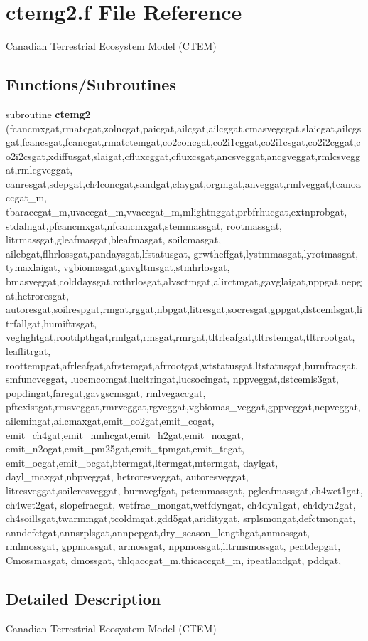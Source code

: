 \hypertarget{ctemg2_8f}{}\section{ctemg2.\+f File Reference}
\label{ctemg2_8f}


Canadian Terrestrial Ecosystem Model (C\+T\+E\+M)  


\subsection*{Functions/\+Subroutines}
\begin{DoxyCompactItemize}
\item 
\hypertarget{ctemg2_8f_a14acc07afd1ff93199aec250465781cb}{}subroutine {\bfseries ctemg2} (fcancmxgat,rmatcgat,zolncgat,paicgat,ailcgat,ailcggat,cmasvegcgat,slaicgat,ailcgsgat,fcancsgat,fcancgat,rmatctemgat,co2concgat,co2i1cggat,co2i1csgat,co2i2cggat,co2i2csgat,xdiffusgat,slaigat,cfluxcggat,cfluxcsgat,ancsveggat,ancgveggat,rmlcsveggat,rmlcgveggat, canresgat,sdepgat,ch4concgat,sandgat,claygat,orgmgat,anveggat,rmlveggat,tcanoaccgat\+\_\+m, tbaraccgat\+\_\+m,uvaccgat\+\_\+m,vvaccgat\+\_\+m,mlightnggat,prbfrhucgat,extnprobgat, stdalngat,pfcancmxgat,nfcancmxgat,stemmassgat, rootmassgat, litrmassgat,gleafmasgat,bleafmasgat, soilcmasgat, ailcbgat,flhrlossgat,pandaysgat,lfstatusgat, grwtheffgat,lystmmasgat,lyrotmasgat, tymaxlaigat, vgbiomasgat,gavgltmsgat,stmhrlosgat, bmasveggat,colddaysgat,rothrlosgat,alvsctmgat,alirctmgat,gavglaigat,nppgat,nepgat,hetroresgat, autoresgat,soilrespgat,rmgat,rggat,nbpgat,litresgat,socresgat,gppgat,dstcemlsgat,litrfallgat,humiftrsgat, veghghtgat,rootdpthgat,rmlgat,rmsgat,rmrgat,tltrleafgat,tltrstemgat,tltrrootgat, leaflitrgat, roottempgat,afrleafgat,afrstemgat,afrrootgat,wtstatusgat,ltstatusgat,burnfracgat, smfuncveggat, lucemcomgat,lucltringat,lucsocingat, nppveggat,dstcemls3gat, popdingat,faregat,gavgscmsgat, rmlvegaccgat, pftexistgat,rmsveggat,rmrveggat,rgveggat,vgbiomas\+\_\+veggat,gppveggat,nepveggat,ailcmingat,ailcmaxgat,emit\+\_\+co2gat,emit\+\_\+cogat, emit\+\_\+ch4gat,emit\+\_\+nmhcgat,emit\+\_\+h2gat,emit\+\_\+noxgat, emit\+\_\+n2ogat,emit\+\_\+pm25gat,emit\+\_\+tpmgat,emit\+\_\+tcgat, emit\+\_\+ocgat,emit\+\_\+bcgat,btermgat,ltermgat,mtermgat, daylgat, dayl\+\_\+maxgat,nbpveggat, hetroresveggat, autoresveggat, litresveggat,soilcresveggat, burnvegfgat, pstemmassgat, pgleafmassgat,ch4wet1gat, ch4wet2gat, slopefracgat, wetfrac\+\_\+mongat,wetfdyngat, ch4dyn1gat, ch4dyn2gat, ch4soillsgat,twarmmgat,tcoldmgat,gdd5gat,ariditygat, srplsmongat,defctmongat, anndefctgat,annsrplsgat,annpcpgat,dry\+\_\+season\+\_\+lengthgat,anmossgat, rmlmossgat, gppmossgat, armossgat, nppmossgat,litrmsmossgat, peatdepgat, Cmossmasgat, dmossgat, thlqaccgat\+\_\+m,thicaccgat\+\_\+m, ipeatlandgat, pddgat,\label{ctemg2_8f_a14acc07afd1ff93199aec250465781cb}

\end{DoxyCompactItemize}


\subsection{Detailed Description}
Canadian Terrestrial Ecosystem Model (C\+T\+E\+M) 


